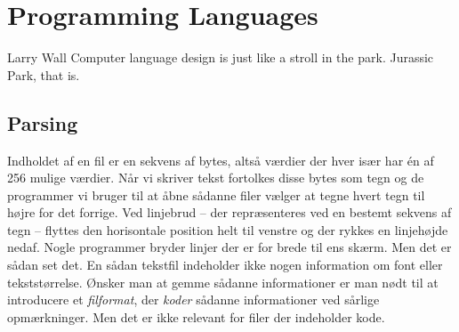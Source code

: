 \chapter{Programming Languages}
\label{sec:lang}

\begin{inspiration}{Larry Wall}
Computer language design is just like a stroll in the park. Jurassic Park, that is.
\end{inspiration}


\section{Parsing}

Indholdet af en fil er en sekvens af bytes, altså værdier der hver især har én af 256 mulige værdier. Når vi skriver tekst fortolkes disse bytes som tegn og de programmer vi bruger til at åbne sådanne filer vælger at tegne hvert tegn til højre for det forrige. Ved linjebrud -- der repræsenteres ved en bestemt sekvens af tegn -- flyttes den horisontale position helt til venstre og der rykkes en linjehøjde nedaf. Nogle programmer bryder linjer der er for brede til ens skærm. Men det er sådan set det. En sådan tekstfil indeholder ikke nogen information om font eller tekststørrelse. Ønsker man at gemme sådanne informationer er man nødt til at introducere et \textsl{filformat}, der \textsl{koder} sådanne informationer ved sårlige opmærkninger. Men det er ikke relevant for filer der indeholder kode.

